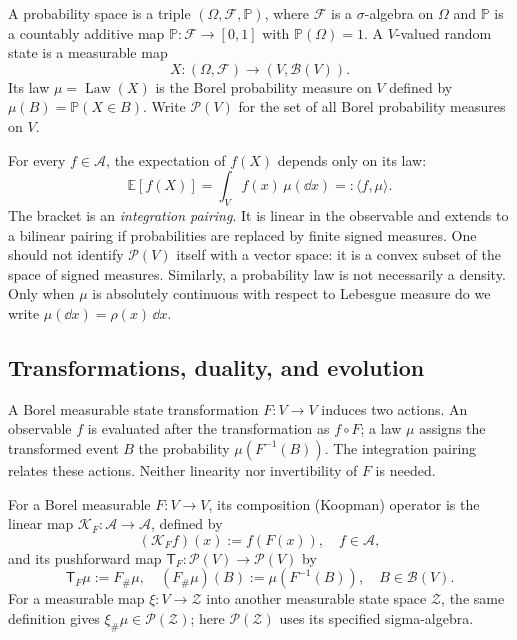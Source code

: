 \documentclass[12pt,a4paper,oneside]{book}
\begin{document}
\begin{definition}
A probability space is a triple $(\Omega,\mathcal F,\mathbb P)$, where $\mathcal F$ is a $\sigma$-algebra on $\Omega$ and
$\mathbb P$ is a countably additive map $\mathbb P:\mathcal F\to[0,1]$ with $\mathbb P(\Omega)=1$. A $V$-valued random
state is a measurable map
\begin{equation*}
    X:(\Omega,\mathcal F)\longrightarrow(V,\mathcal B(V)).
\end{equation*}
Its law $\mu=\operatorname{Law}(X)$ is the Borel probability measure on $V$ defined by $\mu(B)=\mathbb P(X\in B)$. Write
$\mathcal P(V)$ for the set of all Borel probability measures on $V$.
\end{definition}

For every $f\in\mathcal A$, the expectation of $f(X)$ depends only on its law:
\begin{equation*}
    \mathbb E[f(X)]=\int_V f(x)\,\mu(\dd x) =:\langle f,\mu\rangle.
\end{equation*}
The bracket is an \emph{integration pairing}. It is linear in the observable and extends to a bilinear pairing if probabilities
are replaced by finite signed measures. One should not identify $\mathcal P(V)$ itself with a vector space: it is a convex
subset of the space of signed measures. Similarly, a probability law is not necessarily a density. Only when $\mu$ is absolutely
continuous with respect to Lebesgue measure do we write $\mu(\dd x)=\rho(x)\,\dd x$.

\subsection{Transformations, duality, and evolution}

A Borel measurable state transformation $F:V\to V$ induces two actions.
An observable $f$ is evaluated after the transformation as $f\circ F$;
a law $\mu$ assigns the transformed event $B$ the probability
$\mu(F^{-1}(B))$. The integration pairing relates these actions.
Neither linearity nor invertibility of $F$ is needed.

\begin{definition}
For a Borel measurable $F:V\to V$, its composition (Koopman) operator is the linear map $\mathcal{K}_F:\mathcal A\to\mathcal A$,
defined by
\begin{equation*}
(\mathcal{K}_Ff)(x):=f(F(x)),\quad f\in\mathcal A,
\end{equation*}
and its pushforward map $\mathsf T_F:\mathcal P(V)\to\mathcal P(V)$ by
\begin{equation*}
\mathsf T_F\mu:=F_\#\mu,\quad (F_\#\mu)(B):=\mu(F^{-1}(B)),\quad B\in\mathcal B(V).
\end{equation*}
For a measurable map $\xi:V\to\mathcal Z$ into another measurable state space $\mathcal Z$, the same definition gives
$\xi_\#\mu\in\mathcal P(\mathcal Z)$; here $\mathcal P(\mathcal Z)$ uses its specified sigma-algebra.
\end{definition}
\end{document}
